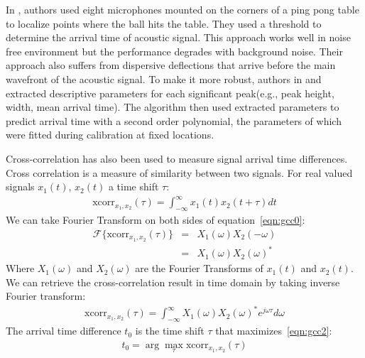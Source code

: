 In \cite{tdoa:ppp}, authors used eight microphones mounted on the corners of a ping pong table to localize points where the ball hits the table. They used a threshold to determine the arrival time of acoustic signal. This approach works well in noise free environment but the performance degrades with background noise. Their approach also suffers from dispersive deflections that arrive before the main wavefront of the acoustic signal. To make it more robust, authors in \cite{tdoa:mit3} and \cite{tdoa:mit4} extracted descriptive parameters for each significant peak(e.g., peak height, width, mean arrival time). The algorithm then used extracted parameters to predict arrival time with a second order polynomial, the parameters of which were fitted during calibration at fixed locations.

Cross-correlation has also been used to measure signal arrival time differences\cite{tdoa:mit2, tdoa:micloc, tdoa:3}. Cross correlation is a measure of similarity between two signals. For real valued signals $x_1(t)$, $x_2(t)$ a time shift $\tau$:
\begin{eqnarray}\label{eqn:gcc0}
\mbox{xcorr}_{x_1,x_2}(\tau) = \int_{-\infty}^{\infty} x_1(t) x_2(t+\tau)dt
\end{eqnarray}
We can take Fourier Transform on both sides of equation~\ref{eqn:gcc0}:
\begin{eqnarray}\label{eqn:gcc1}
\mathcal{F}\{\mbox{xcorr}_{x_1,x_2}(\tau)\} & = & X_1(\omega) X_2(-\omega)\\
& =& X_1(\omega) X_2(\omega)^*
\end{eqnarray}
Where $X_1(\omega)$ and $X_2(\omega)$ are the Fourier Transforms of $x_1(t)$ and $x_2(t)$. We can retrieve the cross-correlation result in time domain by taking inverse Fourier transform:
\begin{eqnarray}\label{eqn:gcc2}
\mbox{xcorr}_{x_1,x_2}(\tau) = \int_{-\infty}^\infty X_1(\omega)X_2(\omega)^*e^{j\omega\tau} d\omega
\end{eqnarray}
The arrival time difference $t_0$ is the time shift $\tau$ that maximizes~\ref{eqn:gcc2}:
\begin{eqnarray}\label{eqn:gcc3}
t_0 = \arg\max_\tau\mbox{xcorr}_{x_1,x_2}(\tau) 
\end{eqnarray}

